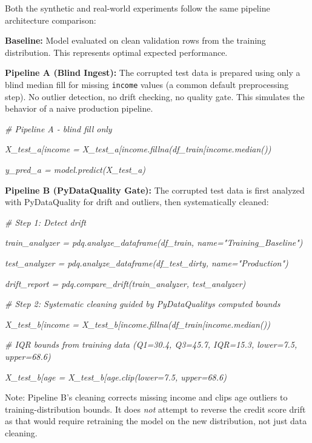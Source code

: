 \documentclass{article}
\begin{document}
Both the synthetic and real-world experiments follow the same pipeline
architecture comparison:

\textbf{Baseline:} Model evaluated on clean validation rows from the
training distribution. This represents optimal expected performance.

\textbf{Pipeline A (Blind Ingest):} The corrupted test data is prepared
using only a blind median fill for missing \texttt{income} values (a
common default preprocessing step). No outlier detection, no drift
checking, no quality gate. This simulates the behavior of a naive
production pipeline.

\emph{\# Pipeline A - blind fill only}

\emph{X\_test\_a{[}\textquotesingle income\textquotesingle{]} =
X\_test\_a{[}\textquotesingle income\textquotesingle{]}.fillna(df\_train{[}\textquotesingle income\textquotesingle{]}.median())}

\emph{y\_pred\_a = model.predict(X\_test\_a)}

\textbf{Pipeline B (PyDataQuality Gate):} The corrupted test data is
first analyzed with PyDataQuality for drift and outliers, then
systematically cleaned:

\emph{\# Step 1: Detect drift}

\emph{train\_analyzer = pdq.analyze\_dataframe(df\_train,
name="Training\_Baseline")}

\emph{test\_analyzer = pdq.analyze\_dataframe(df\_test\_dirty,
name="Production")}

\emph{drift\_report = pdq.compare\_drift(train\_analyzer,
test\_analyzer)}

\emph{\# Step 2: Systematic cleaning guided by
PyDataQuality\textquotesingle s computed bounds}

\emph{X\_test\_b{[}\textquotesingle income\textquotesingle{]} =
X\_test\_b{[}\textquotesingle income\textquotesingle{]}.fillna(df\_train{[}\textquotesingle income\textquotesingle{]}.median())}

\emph{\# IQR bounds from training data (Q1=30.4, Q3=45.7, IQR=15.3,
lower=7.5, upper=68.6)}

\emph{X\_test\_b{[}\textquotesingle age\textquotesingle{]} =
X\_test\_b{[}\textquotesingle age\textquotesingle{]}.clip(lower=7.5,
upper=68.6)}

Note: Pipeline B's cleaning corrects missing income and clips age
outliers to training-distribution bounds. It does \emph{not} attempt to
reverse the credit score drift as that would require retraining the
model on the new distribution, not just data cleaning.
\end{document}
